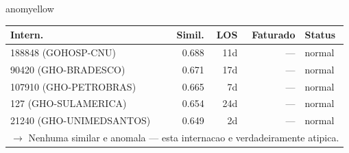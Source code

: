\documentclass[a4paper,10pt]{article}
\begin{document}
\begin{anomalycard}[Internacao 168290 | GHO-PETROBRAS | MODERADO (z=2.30)]{anomyellow}
\begin{tabular}{l r r r l}\toprule\textbf{Intern.} & \textbf{Simil.} & \textbf{LOS} & \textbf{Faturado} & \textbf{Status} \\\midrule
188848 (GOHOSP-CNU) & 0.688 & 11d & --- & \textcolor{jcubeblue}{normal} \\
90420 (GHO-BRADESCO) & 0.671 & 17d & --- & \textcolor{jcubeblue}{normal} \\
107910 (GHO-PETROBRAS) & 0.665 & 7d & --- & \textcolor{jcubeblue}{normal} \\
127 (GHO-SULAMERICA) & 0.654 & 24d & --- & \textcolor{jcubeblue}{normal} \\
21240 (GHO-UNIMEDSANTOS) & 0.649 & 2d & --- & \textcolor{jcubeblue}{normal} \\
\multicolumn{5}{l}{\textcolor{jcubeblue}{\small $\rightarrow$ Nenhuma similar e anomala --- esta internacao e verdadeiramente atipica.}} \\
\bottomrule\end{tabular}


\end{anomalycard}

\newpage
\end{document}
